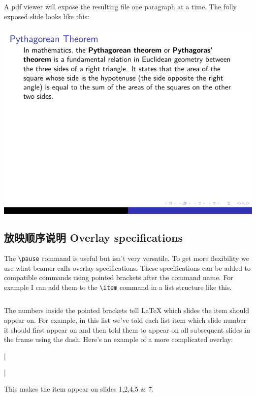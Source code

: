 \begin{column}{0.5\textwidth}
\inputminted[linenos=true]{latex}{examples/beamer/beameroverlay02.tex}

A pdf viewer will expose the resulting file one paragraph at a time. The fully exposed slide looks like this:

\includegraphics[page=4]{examples/beamer/beameroverlay02.pdf}

\subsection{放映顺序说明 Overlay specifications}

The \verb|\pause| command is useful but isn't very versatile. To get more flexibility we use what beamer calls overlay specifications. These specifications can be added to compatible commands using pointed brackets after the command name. For example I can add them to the \verb|\item| command in a list structure like this.

\inputminted[linenos=true]{latex}{examples/beamer/beameroverlay03.tex}

The numbers inside the pointed brackets tell LaTeX which slides the item should appear on. For example, in this list we've told each list item which slide number it should first appear on and then told them to appear on all subsequent slides in the frame using the dash. Here's an example of a more complicated overlay:

|\item<-2,4-5,7>|

This makes the item appear on slides 1,2,4,5 \& 7.


\end{column}
